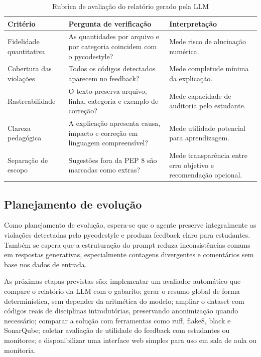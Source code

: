 \documentclass[12pt]{article}
\begin{document}
\begin{table}[ht]
\centering
\caption{Rubrica de avaliação do relatório gerado pela LLM}
\label{tab:rubrica}
\small
\begin{tabular}{p{3.2cm}p{5.4cm}p{4.2cm}}
\toprule
\textbf{Critério} & \textbf{Pergunta de verificação} & \textbf{Interpretação}\\
\midrule
Fidelidade quantitativa & As quantidades por arquivo e por categoria coincidem
com o pycodestyle? & Mede risco de alucinação numérica.\\
Cobertura das violações & Todos os códigos detectados aparecem no feedback? &
Mede completude mínima da explicação.\\
Rastreabilidade & O texto preserva arquivo, linha, categoria e exemplo de
correção? & Mede capacidade de auditoria pelo estudante.\\
Clareza pedagógica & A explicação apresenta causa, impacto e correção em
linguagem compreensível? & Mede utilidade potencial para aprendizagem.\\
Separação de escopo & Sugestões fora da PEP 8 são marcadas como extras? &
Mede transparência entre erro objetivo e recomendação opcional.\\
\bottomrule
\end{tabular}
\end{table}

\subsection{Planejamento de evolução}

Como planejamento de evolução, espera-se que o agente preserve integralmente as
violações detectadas pelo pycodestyle e produza feedback claro para estudantes.
Também se espera que a estruturação do prompt reduza inconsistências comuns em
respostas generativas, especialmente contagens divergentes e comentários sem
base nos dados de entrada.

As próximas etapas previstas são: implementar um avaliador automático que compare
o relatório da LLM com o gabarito; gerar o resumo global de forma determinística,
sem depender da aritmética do modelo; ampliar o dataset com códigos reais de
disciplinas introdutórias, preservando anonimização quando necessário; comparar
a solução com ferramentas como ruff, flake8, black e
SonarQube; coletar avaliação de utilidade do feedback com estudantes ou
monitores; e disponibilizar uma interface web simples para uso em sala de aula
ou monitoria.
\end{document}
